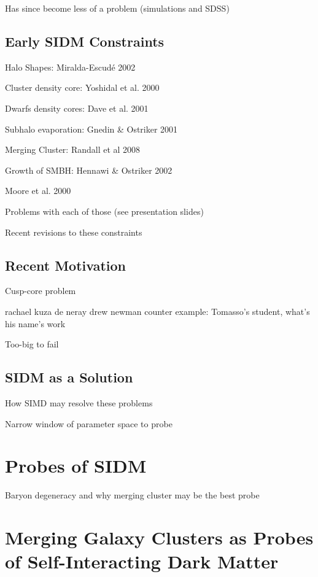 Has since become less of a problem (simulations and SDSS)

\subsection{Early SIDM Constraints}

Halo Shapes: Miralda-Escudé 2002

Cluster density core: Yoshidal et al. 2000

Dwarfs density cores: Dave et al. 2001

Subhalo evaporation: Gnedin & Ostriker 2001

Merging Cluster: Randall et al 2008

Growth of SMBH: Hennawi & Ostriker 2002

Moore et al. 2000 \citep{Moore:2000ee}

Problems with each of those (see presentation slides)

Recent revisions to these constraints \citep{Peter:2012vi}

\subsection{Recent Motivation}

Cusp-core problem

	rachael kuza de neray
	drew newman
	counter example: Tomasso's student, what's his name's work

Too-big to fail

\subsection{SIDM as a Solution}

How SIMD may resolve these problems

Narrow window of parameter space to probe \citep{Rocha:2012tr}

\section{Probes of SIDM}



Baryon degeneracy and why merging cluster may be the best probe

\section{Merging Galaxy Clusters as Probes of Self-Interacting Dark Matter}

